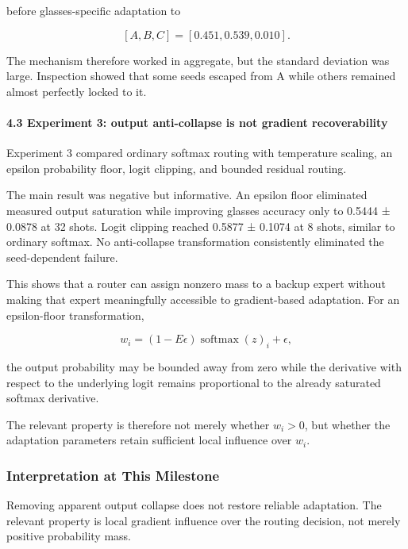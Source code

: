 \documentclass[
  10pt,
]{article}
\begin{document}
before glasses-specific adaptation to

\[
[A,B,C]=[0.451,0.539,0.010].
\]

The mechanism therefore worked in aggregate, but the standard deviation
was large. Inspection showed that some seeds escaped from A while others
remained almost perfectly locked to it.

\hypertarget{experiment-3-output-anti-collapse-is-not-gradient-recoverability}{%
\paragraph{4.3 Experiment 3: output anti-collapse is not gradient
recoverability}\label{experiment-3-output-anti-collapse-is-not-gradient-recoverability}}

Experiment 3 compared ordinary softmax routing with temperature scaling,
an epsilon probability floor, logit clipping, and bounded residual
routing.

The main result was negative but informative. An epsilon floor
eliminated measured output saturation while improving glasses accuracy
only to 0.5444 ± 0.0878 at 32 shots. Logit clipping reached 0.5877 ±
0.1074 at 8 shots, similar to ordinary softmax. No anti-collapse
transformation consistently eliminated the seed-dependent failure.

This shows that a router can assign nonzero mass to a backup expert
without making that expert meaningfully accessible to gradient-based
adaptation. For an epsilon-floor transformation,

\[
w_i=(1-E\epsilon)\operatorname{softmax}(z)_i+\epsilon,
\]

the output probability may be bounded away from zero while the
derivative with respect to the underlying logit remains proportional to
the already saturated softmax derivative.

The relevant property is therefore not merely whether \(w_i>0\), but
whether the adaptation parameters retain sufficient local influence over
\(w_i\).

\hypertarget{interpretation-at-this-milestone}{%
\subsubsection{Interpretation at This
Milestone}\label{interpretation-at-this-milestone}}

Removing apparent output collapse does not restore reliable adaptation.
The relevant property is local gradient influence over the routing
decision, not merely positive probability mass.
\end{document}
